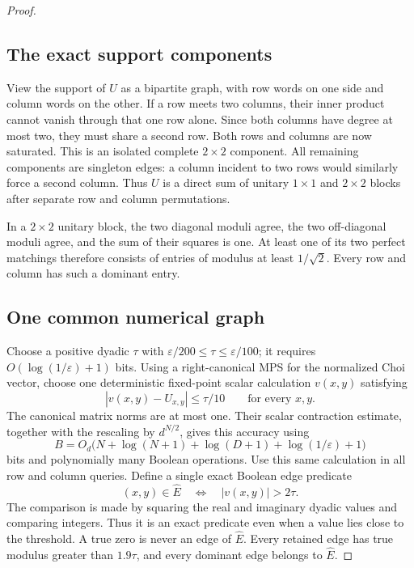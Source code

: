 \documentclass[11pt]{article}
\begin{document}
\begin{proof}
\subsection*{The exact support components}

View the support of $U$ as a bipartite graph, with row words
on one side and column words on the other.
If a row meets two columns, their inner product cannot vanish
through that one row alone. Since both columns have degree
at most two, they must share a second row.
Both rows and columns are now saturated. This is an isolated
complete $2\times2$ component. All remaining components are
singleton edges: a column incident to two rows would similarly
force a second column. Thus $U$ is a direct sum of unitary
$1\times1$ and $2\times2$ blocks after separate row and column
permutations.

In a $2\times2$ unitary block, the two diagonal moduli agree,
the two off-diagonal moduli agree, and the sum of their
squares is one. At least one of its two perfect matchings
therefore consists of entries of modulus at least $1/\sqrt2$.
Every row and column has such a dominant entry.

\subsection*{One common numerical graph}

Choose a positive dyadic $\tau$ with
$\varepsilon/200\le\tau\le\varepsilon/100$;
it requires $O(\log(1/\varepsilon)+1)$ bits.
Using a right-canonical MPS for the normalized Choi vector,
choose one deterministic fixed-point scalar calculation
$v(x,y)$ satisfying
\[
 |v(x,y)-U_{x,y}|\le\tau/10
       \qquad\text{for every }x,y.
\]
The canonical matrix norms are at most one. Their scalar
contraction estimate, together with the rescaling by
$d^{N/2}$, gives this accuracy using
\[
 B=O_d\bigl(N+\log(N+1)+\log(D+1)
                       +\log(1/\varepsilon)+1\bigr)
\]
bits and polynomially many Boolean operations.
Use this same calculation in all row and column queries.
Define a single exact Boolean edge predicate
\[
 (x,y)\in\widehat E\quad\Longleftrightarrow\quad
                   |v(x,y)|>2\tau.
\]
The comparison is made by squaring the real and imaginary
dyadic values and comparing integers. Thus it is an exact
predicate even when a value lies close to the threshold.
A true zero is never an edge of $\widehat E$.
Every retained edge has true modulus greater than $1.9\tau$,
and every dominant edge belongs to $\widehat E$.


\end{proof}
\end{document}
